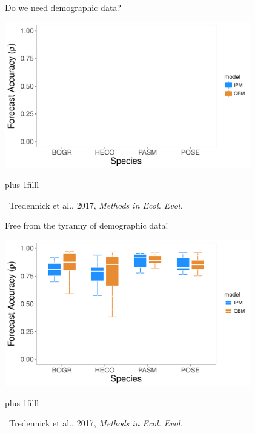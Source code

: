\documentclass[12pt, compress, aspectratio=1610]{beamer}
\newcommand{\btVFill}{\vskip0pt plus 1filll}
\newcommand{\credit}[1]{\btVFill\par\hfill \footnotesize ~#1}
\begin{document}
\begin{frame}{%
\protect\hypertarget{do-we-need-demographic-data}{%
Do we need demographic data?}}

\centering

\includegraphics[height=2.5in]{./figures/mee_forecast_accuracy_empty.pdf}

\credit{Tredennick et al., 2017, \emph{Methods in Ecol. Evol.}}

\end{frame}

\begin{frame}{%
\protect\hypertarget{free-from-the-tyranny-of-demographic-data}{%
Free from the tyranny of demographic data!}}

\centering

\includegraphics[height=2.5in]{./figures/mee_forecast_accuracy.pdf}

\credit{Tredennick et al., 2017, \emph{Methods in Ecol. Evol.}}

\end{frame}
\end{document}
